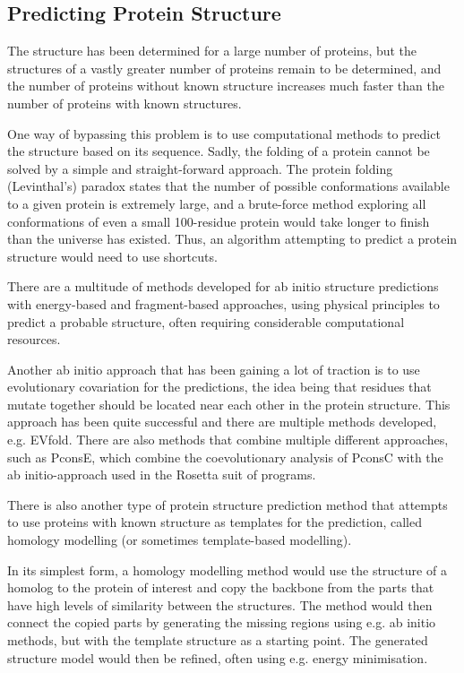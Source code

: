 \documentclass[a4paper, twoside, 12pt, openright]{report}
\begin{document}
\subsection{Predicting Protein Structure}
\label{sec:struc_pred}

The structure has been determined for a large number of proteins, but the structures of a vastly greater number of proteins remain to be determined, and the number of proteins without known structure increases much faster than the number of proteins with known structures.

One way of bypassing this problem is to use computational methods to predict the structure based on its sequence. Sadly, the folding of a protein cannot be solved by a simple and straight-forward approach. The protein folding (Levinthal's) paradox\cite{levinthal_how_1969} states that the number of possible conformations available to a given protein is extremely large, and a brute-force method exploring all conformations of even a small 100-residue protein would take longer to finish than the universe has existed. Thus, an algorithm attempting to predict a protein structure would need to use shortcuts.

There are a multitude of methods developed for ab initio structure predictions with energy-based and fragment-based approaches, using physical principles to predict a probable structure, often requiring considerable computational resources.

Another ab initio approach that has been gaining a lot of traction is to use evolutionary covariation for the predictions, the idea being that residues that mutate together should be located near each other in the protein structure. This approach has been quite successful and there are multiple methods developed, e.g. EVfold\cite{marks_protein_2011}. There are also methods that combine multiple different approaches, such as PconsE, which combine the coevolutionary analysis of PconsC\cite{skwark_pconsc:_2013} with the ab initio-approach used in the Rosetta suit of programs\cite{simons_assembly_1997}.

There is also another type of protein structure prediction method that attempts to use proteins with known structure as templates for the prediction, called homology modelling (or sometimes template-based modelling).

In its simplest form, a homology modelling method would use the structure of a homolog to the protein of interest and copy the backbone from the parts that have high levels of similarity between the structures. The method would then connect the copied parts by generating the missing regions using e.g. ab initio methods, but with the template structure as a starting point. The generated structure model would then be refined, often using e.g. energy minimisation.
\end{document}
